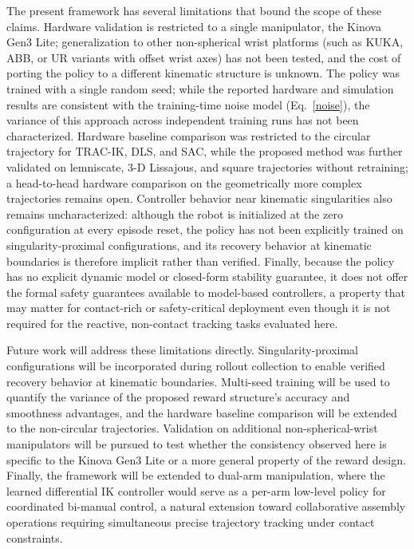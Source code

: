 \documentclass[preprint,12pt]{elsarticle}
\begin{document}
The present framework has several limitations that bound the scope of
these claims. Hardware validation is restricted to a single manipulator,
the Kinova Gen3 Lite; generalization to other non-spherical wrist platforms
(such as KUKA, ABB, or UR variants with offset wrist axes) has not been
tested, and the cost of porting the policy to a different kinematic
structure is unknown. The policy was trained with a single random seed;
while the reported hardware and simulation results are consistent with the
training-time noise model (Eq.~\ref{noise}), the variance of this approach across independent training runs has not been characterized. Hardware baseline comparison was restricted to the circular trajectory for TRAC-IK, DLS, and SAC, while the proposed method was further validated on lemniscate, 3-D Lissajous, and square trajectories without retraining; a head-to-head hardware comparison on the geometrically more complex trajectories remains open. Controller behavior near kinematic singularities also remains uncharacterized: although the robot is initialized at the zero configuration at every episode reset, the policy has not been explicitly trained on singularity-proximal configurations, and its recovery behavior at kinematic boundaries is therefore implicit rather than verified. Finally, because the policy has no explicit dynamic model or closed-form stability guarantee, it does not offer the formal safety guarantees available to model-based controllers, a property that may matter for contact-rich or safety-critical deployment even though it is not required for the reactive, non-contact tracking tasks evaluated here.

Future work will address these limitations directly. Singularity-proximal
configurations will be incorporated during rollout collection to enable
verified recovery behavior at kinematic boundaries. Multi-seed training
will be used to quantify the variance of the proposed reward structure's
accuracy and smoothness advantages, and the hardware baseline comparison
will be extended to the non-circular trajectories. Validation on additional
non-spherical-wrist manipulators will be pursued to test whether the
consistency observed here is specific to the Kinova Gen3 Lite or a more
general property of the reward design. Finally, the framework will be
extended to dual-arm manipulation, where the learned differential IK
controller would serve as a per-arm low-level policy for coordinated
bi-manual control, a natural extension toward collaborative assembly
operations requiring simultaneous precise trajectory tracking under contact
constraints.
\end{document}
